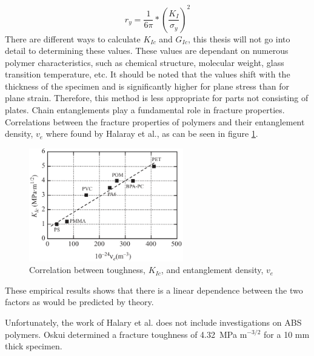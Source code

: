 \begin{equation} \label{eqn:cracktip}
r_y=\frac{1}{6\pi}*\left(\frac{K_I}{\sigma_y}\right)^2
\end{equation}There are different ways to calculate $K_{Ic}$ and  $G_{Ic}$, this thesis will not go into detail to determining these values. These values are dependant on numerous polymer characteristics, such as chemical structure, molecular weight, glass transition temperature, etc. It should be noted that the values shift with the thickness of the specimen and is significantly higher for plane stress than for plane strain. Therefore, this method is less appropriate for parts not consisting of plates. 
Chain entanglements play a fundamental role in fracture properties. Correlations between the fracture properties of polymers and their entanglement density, $v_e$ where found by Halaray et al., as can be seen in figure \ref{ref:KIc}.  

\begin{figure}[htb]
    \centering
    \includegraphics[width=0.6\textwidth]{chapter_2/figures/KIc.png}
    \caption{Correlation between toughness, $K_{Ic}$, and entanglement density, $v_e$  \cite{Halary2011PolymerMaterials}}
    \label{ref:KIc}
\end{figure}
These empirical results shows that there is a linear dependence  between the two factors as would be predicted by theory. 

Unfortunately, the work of Halary et al. does not include investigations on ABS polymers. 
Oskui \cite{Oskui2014ExperimentalDevice} determined a fracture toughness of 4.32~MPa m$^{-3/2}$ for a 10 mm thick specimen. %


